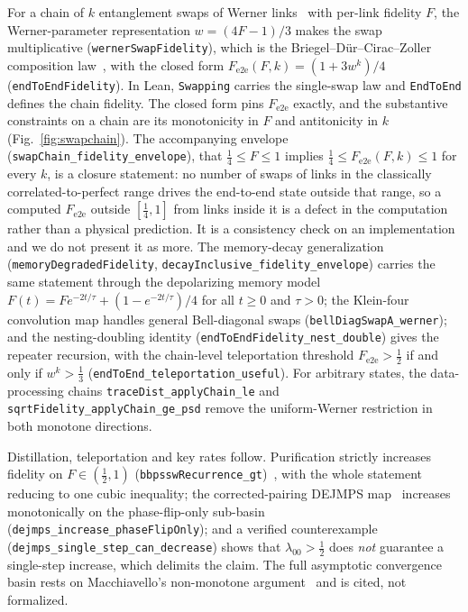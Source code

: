 \documentclass[aps,pra,reprint,nofootinbib,superscriptaddress]{revtex4-2}
\theoremstyle{plain}
\theoremstyle{definition}
\theoremstyle{remark}
\newcommand{\lean}[1]{\texttt{#1}}
\begin{document}
For a chain of $k$ entanglement swaps of Werner links~\cite{WernerState1989}
with per-link fidelity $F$, the Werner-parameter representation
$w = (4F-1)/3$ makes the swap multiplicative (\lean{wernerSwapFidelity}),
which is the Briegel--D\"ur--Cirac--Zoller composition
law~\cite{BDCZ1998}, with the closed form
$F_{\mathrm{e2e}}(F,k) = (1+3w^k)/4$ (\lean{endToEndFidelity}). In
Lean, \lean{Swapping} carries the single-swap law and \lean{EndToEnd}
defines the chain fidelity. The closed form pins $F_{\mathrm{e2e}}$ exactly, and the substantive
constraints on a chain are its monotonicity in $F$ and antitonicity in
$k$ (Fig.~\ref{fig:swapchain}). The accompanying envelope
(\lean{swapChain\_fidelity\_envelope}), that $\tfrac14 \le F \le 1$
implies $\tfrac14 \le F_{\mathrm{e2e}}(F,k) \le 1$ for every $k$, is a
closure statement: no number of swaps of links in the classically
correlated-to-perfect range drives the end-to-end state outside that
range, so a computed $F_{\mathrm{e2e}}$ outside $[\tfrac14,1]$ from links
inside it is a defect in the computation rather than a physical
prediction. It is a consistency check on an implementation and we do not
present it as more. The memory-decay generalization
(\lean{memoryDegradedFidelity},
\lean{decayInclusive\_fidelity\_envelope}) carries the same statement
through the depolarizing memory model
$F(t) = F e^{-2t/\tau} + (1-e^{-2t/\tau})/4$ for all $t \ge 0$ and
$\tau > 0$; the Klein-four convolution map handles general Bell-diagonal
swaps (\lean{bellDiagSwapA\_werner}); and the nesting-doubling identity
(\lean{endToEndFidelity\_nest\_double}) gives the repeater recursion,
with the chain-level teleportation threshold
$F_{\mathrm{e2e}} > \tfrac12$ if and only if $w^k > \tfrac13$
(\lean{endToEnd\_teleportation\_useful}). For arbitrary states, the
data-processing chains \lean{traceDist\_applyChain\_le} and
\lean{sqrtFidelity\_applyChain\_ge\_psd} remove the uniform-Werner
restriction in both monotone directions.

Distillation, teleportation and key rates follow. Purification strictly
increases fidelity on $F\in(\tfrac12,1)$
(\lean{bbpsswRecurrence\_gt})~\cite{BBPSSW1996}, with the whole statement
reducing to one cubic inequality; the corrected-pairing DEJMPS
map~\cite{DEJMPS1996} increases monotonically on the phase-flip-only
sub-basin (\lean{dejmps\_increase\_phaseFlipOnly}); and a verified
counterexample (\lean{dejmps\_single\_step\_can\_decrease}) shows that
$\lambda_{00} > \tfrac12$ does \emph{not} guarantee a single-step
increase, which delimits the claim. The full asymptotic convergence basin
rests on Macchiavello's non-monotone argument~\cite{Macchiavello1998} and
is cited, not formalized.
\end{document}

